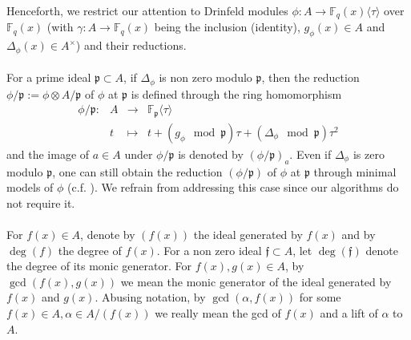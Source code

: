 \documentclass[12pt]{article}
\theoremstyle{plain}
\theoremstyle{definition}
\newcommand{\ang}[1]{\langle#1\rangle}
\def\F{\ensuremath{\mathbb{F}}}
\newcommand{\ph}{(\phi/\p)}
\newcommand{\p}{\mathfrak p}
\newcommand{\f}{\mathfrak f}
\begin{document}
Henceforth, we restrict our attention to Drinfeld modules $\phi:A \longrightarrow \F_q(x)\langle\tau\rangle$ over $\F_q(x)$ (with $\gamma : A \rightarrow \F_q(x)$ being the inclusion (identity), $g_\phi(x)\in A$ and $\Delta_\phi(x)\in A^\times$) and their reductions.\\ \\
For a prime ideal $\p \subset A$, if $\Delta_\phi$ is non zero modulo $\p$, then the reduction 
$\phi/\p := \phi \otimes A/\p$ of $\phi$ at $\p$ is defined through the ring homomorphism 
\[
\begin{array}{rlll}
	\phi/\p : & A & \longrightarrow & \F_\p \ang{\tau} \\
	& t & \longmapsto & t + (g_\phi \mod \p) \tau + (\Delta_\phi\mod\p) \tau^2
\end{array}
\]
and the image of $a \in A$ under $\phi/\p$ is denoted by $(\phi/\p)_a$. Even if $\Delta_{\phi}$ is 
zero modulo $\p$, one can still obtain the reduction $(\phi/\p)$ of $\phi$ at $\p$ through minimal 
models of $\phi$ (c.f. \cite{gek1}). We refrain from addressing this case since our algorithms do 
not require it.\\ \\
For $f(x) \in A$, denote by $(f(x))$ the ideal generated by $f(x)$ and by $\deg(f)$ the degree of 
$f(x)$. For a non zero ideal $\f \subset A$, let $\deg(\f)$ denote the degree of its monic 
generator. For $f(x),g(x) \in A$, by $\gcd(f(x),g(x))$ we mean the monic generator of the ideal 
generated by $f(x)$ and $g(x)$. Abusing notation, by $\gcd(\alpha,f(x))$ for some $f(x) \in A, 
\alpha \in A/(f(x))$ we really mean the gcd of $f(x)$ and a lift of $\alpha$ to $A$.
\end{document}
